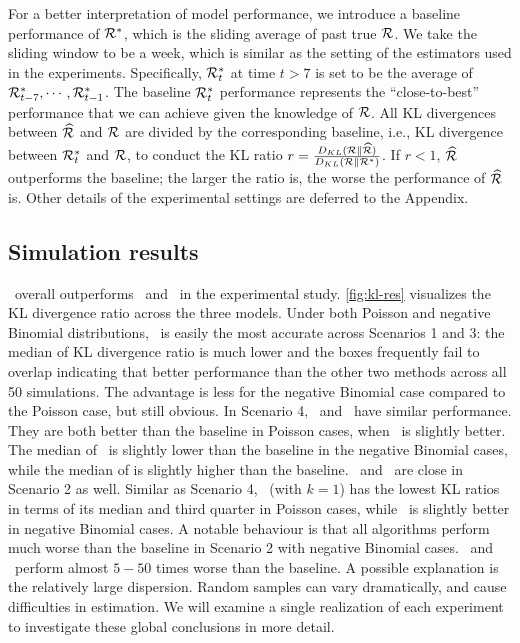 For a better interpretation of model performance, we introduce a baseline performance of
$\mathcal{R}^{\ast}$, which is the sliding average of past true $\mathcal{R}$. We take 
the sliding window to be a week, which is similar as the setting of the estimators 
used in the experiments. Specifically, $\mathcal{R}^{\ast}_t$ at time $t>7$ is set to be 
the average of $\mathcal{R}^{\ast}_{t-7},\cdots,\mathcal{R}^{\ast}_{t-1}$. 
The baseline $\mathcal{R}^{\ast}_t$ performance represents the ``close-to-best'' performance 
that we can achieve given the knowledge of $\mathcal{R}$. 
All KL divergences between $\widehat{\mathcal{R}}$ and $\mathcal{R}$ are divided by the 
corresponding baseline, i.e., KL divergence between $\mathcal{R}^{\ast}_t$ and $\mathcal{R}$, 
to conduct the KL ratio $r = \frac{D_{KL}(\mathcal{R} \parallel \widehat{\mathcal{R}})}{D_{KL}(\mathcal{R} \parallel \mathcal{R}^{\ast})}$. 
If $r<1$, $\widehat{\mathcal{R}}$ outperforms the baseline; the larger the ratio is, 
the worse the performance of $\widehat{\mathcal{R}}$ is. 
Other details of the experimental settings are deferred to the Appendix. 


\subsection{Simulation results}

\RtEstim\ overall outperforms \EpiEstim\ and \EpiLPS\ in the experimental study.
\autoref{fig:kl-res} visualizes the KL divergence ratio across the three models. Under
both Poisson and negative Binomial distributions, \RtEstim\ is easily the most
accurate across Scenarios 1 and 3: the median of KL divergence ratio is much lower
and the boxes frequently fail to overlap indicating that better performance than
the other two methods across all 50 simulations. 
The advantage is less for the
negative Binomial case compared to the Poisson case, but still obvious. 
In Scenario 4, \RtEstim\ and \EpiLPS\ 
have similar performance. They are both better than the baseline in Poisson cases, 
when \RtEstim\ is slightly better. The median of \EpiLPS\ is slightly lower
than the baseline in the negative Binomial cases, while the median of \RtEstim is slightly 
higher than the baseline. 
\EpiLPS\ and \RtEstim\ are close in Scenario 2 as well. Similar as Scenario 4, \RtEstim\ (with $k=1$)
has the lowest KL ratios in terms of its median and third quarter in Poisson cases, while 
\EpiLPS\ is slightly better in negative Binomial cases. 
A notable behaviour is that all algorithms 
perform much worse than the baseline in Scenario 2 with negative Binomial cases. 
\EpiLPS\ and \RtEstim\ perform almost $5-50$ times worse than the baseline. 
A possible explanation is the relatively large dispersion. Random samples can vary dramatically, 
and cause difficulties in estimation. 
We will examine a single
realization of each experiment to investigate these global conclusions in more
detail.


